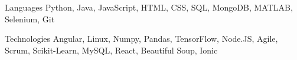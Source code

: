 
\begin{cvskills}
    \cvskill
    {Languages} %
    {Python, Java, JavaScript, HTML, CSS, SQL, MongoDB, MATLAB, Selenium, Git} %
    
     \cvskill
    {Technologies} %
    {Angular, Linux, Numpy, Pandas, TensorFlow, Node.JS, Agile, Scrum, Scikit-Learn, MySQL, React, Beautiful Soup, Ionic} %
    
\end{cvskills}
